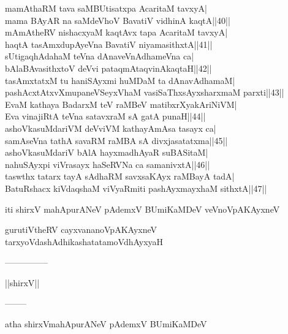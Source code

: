 \documentclass{article}
\begin{document}
mamAthaRM tava saMBUtisatxpa AcaritaM tavxyA|\\
mama BAyAR na saMdeVhoV BavatiV vidhinA kaqtA||40||\\
mAmAtheRV nishacxyaM kaqtAvx tapa AcaritaM tavxyA|\\
haqtA tasAmxdupAyeVna BavatiV niyamasithxtA||41||\\
sUtigaqhAdahaM teVna dAnaveVnAdhameVna ca|\\
bAlaBAvasithxtoV deVvi pataqmAtaqvinAkaqtaH||42||\\
tasAmxtatxM tu haniSAyxmi huMDaM ta dAnavAdhamaM|\\
pashAcxtAtxvXmupaneVSeyxVhaM vasiSaThxsAyxsharxmaM parxti||43||\\
EvaM kathaya BadarxM teV raMBeV matibxrXyakAriNiVM|\\
Eva vinajiRtA teVna satavxraM sA gatA punaH||44||\\
ashoVkasuMdariVM deVviVM kathayAmAsa tasayx ca|\\
samAseVna tathA savaRM raMBA sA divxjasatatxma||45||\\
ashoVkasuMdariV bAlA hayxmadhAyaR suBASitaM|\\
nahuSAyxpi viVrasayx haSeRVNa ca samanivxtA||46||\\
taswthx tatarx tayA sAdhaRM savxsaKAyx raMBayA tadA|\\
BatuRshacx kiVdaqshaM viVyaRmiti pashAyxmayxhaM sithxtA||47||\\

\begin{center}
iti shirxV mahApurANeV pAdemxV BUmiKaMDeV veVnoVpAKAyxneV
\end{center}

\begin{center}
gurutiVtheRV cayxvananoVpAKAyxneV tarxyoVdashAdhikashatatamoVdhAyxyaH
\end{center}

\begin{center}
---------------
\end{center}

\begin{center}
||shirxV||
\end{center}

\begin{center}
--------
\end{center}

\begin{center}
atha shirxVmahApurANeV pAdemxV BUmiKaMDeV
\end{center}
\end{document}
